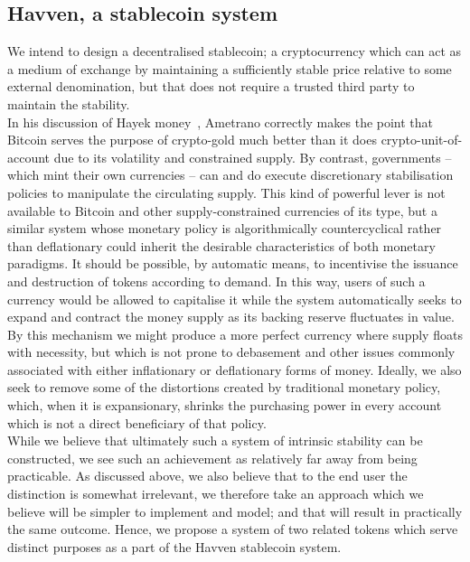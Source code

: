 \subsection{Havven, a stablecoin system}

\noindent We intend to design a decentralised stablecoin; a cryptocurrency which can act as a medium of exchange by maintaining a sufficiently stable price relative to some external denomination, but that does not require a trusted third party to maintain the stability.\\

\noindent  In his discussion of Hayek money~\cite{ametrano2016hayek}, Ametrano correctly makes the point that Bitcoin serves the purpose of crypto-gold much better than it does crypto-unit-of-account due to its volatility and constrained supply. By contrast, governments -- which mint their own currencies -- can and do execute discretionary stabilisation policies to manipulate the circulating supply. This kind of powerful lever is not available to Bitcoin and other supply-constrained currencies of its type, but a similar system whose monetary policy is algorithmically countercyclical rather than deflationary could inherit the desirable characteristics of both monetary paradigms. It should be possible, by automatic means, to incentivise the issuance and destruction of tokens according to demand. In this way, users of such a currency would be allowed to capitalise it while the system automatically seeks to expand and contract the money supply as its backing reserve fluctuates in value. By this mechanism we might produce a more perfect currency where supply floats with necessity, but which is not prone to debasement and other issues commonly associated with either inflationary or deflationary forms of money. Ideally, we also seek to remove some of the distortions created by traditional monetary policy, which, when it is expansionary, shrinks the purchasing power in every account which is not a direct beneficiary of that policy.\\

\noindent While we believe that ultimately such a system of intrinsic stability can be constructed, we see such an achievement as relatively far away from being practicable. As discussed above, we also believe that to the end user the distinction is somewhat irrelevant, we therefore take an approach which we believe will be simpler to implement and model; and that will result in practically the same outcome. Hence, we propose a system of two related tokens which serve distinct purposes as a part of the Havven stablecoin system.

